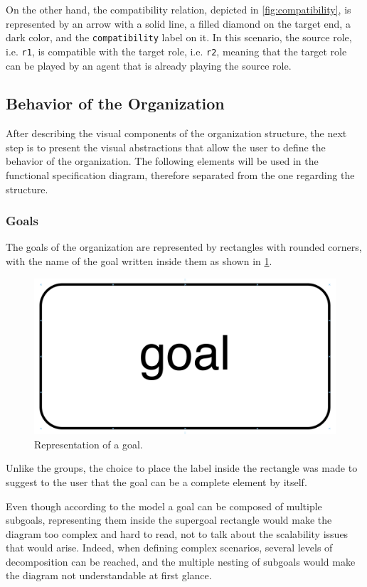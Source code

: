 On the other hand, the compatibility relation, depicted in \cref{fig:compatibility}, is represented by an arrow with a solid line, a filled diamond on the target end, a dark color, and the \texttt{compatibility} label on it.
In this scenario, the source role, i.e. \texttt{r1}, is compatible with the target role, i.e. \texttt{r2}, meaning that the target role can be played by an agent that is already playing the source role.

\subsection{Behavior of the Organization}
After describing the visual components of the organization structure, the next step is to present the visual abstractions that allow the user to define the behavior of the organization.
The following elements will be used in the functional specification diagram, therefore separated from the one regarding the structure.

\subsubsection{Goals}
The goals of the organization are represented by rectangles with rounded corners, with the name of the goal written inside them as shown in \cref{fig:goal}.

\begin{figure}[H]
    \centering
    \includegraphics[width=0.3\linewidth]{images/visual-language/goal.png}
    \caption{Representation of a goal.}
    \label{fig:goal}
\end{figure}

Unlike the groups, the choice to place the label inside the rectangle was made to suggest to the user that the goal can be a complete element by itself.

Even though according to the \moise{} model a goal can be composed of multiple subgoals, representing them inside the supergoal rectangle would make the diagram too complex and hard to read, not to talk about the scalability issues that would arise.
Indeed, when defining complex scenarios, several levels of decomposition can be reached, and the multiple nesting of subgoals would make the diagram not understandable at first glance.

